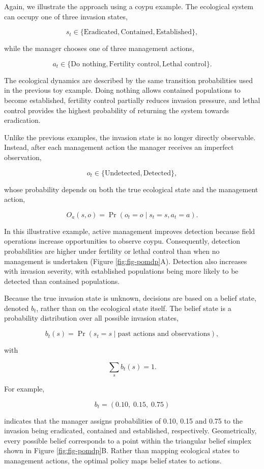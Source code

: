 \documentclass[
  11pt,
  a4paper,
]{article}
\begin{document}
Again, we illustrate the approach using a coypu example. The ecological system can occupy one of three invasion states,

\[
s_t \in
\{\text{Eradicated},
\text{Contained},
\text{Established}\},
\]

while the manager chooses one of three management actions,

\[
a_t \in
\{\text{Do nothing},
\text{Fertility control},
\text{Lethal control}\}.
\]

The ecological dynamics are described by the same transition probabilities used in the previous toy example. Doing nothing allows contained populations to become established, fertility control partially reduces invasion pressure, and lethal control provides the highest probability of returning the system towards eradication.

Unlike the previous examples, the invasion state is no longer directly observable. Instead, after each management action the manager receives an imperfect observation,

\[
o_t \in
\{\text{Undetected},
\text{Detected}\},
\]

whose probability depends on both the true ecological state and the management action,

\[
O_a(s,o)
=
\Pr(o_t=o \mid s_t=s,a_t=a).
\]

In this illustrative example, active management improves detection because field operations increase opportunities to observe coypu. Consequently, detection probabilities are higher under fertility or lethal control than when no management is undertaken (Figure \ref{fig:fig-pomdp}A). Detection also increases with invasion severity, with established populations being more likely to be detected than contained populations.

Because the true invasion state is unknown, decisions are based on a belief state, denoted \(b_t\), rather than on the ecological state itself. The belief state is a probability distribution over all possible invasion states,

\[
b_t(s)
=
\Pr(s_t=s
\mid
\text{past actions and observations}),
\]

with

\[
\sum_s b_t(s)=1.
\]

For example,

\[
b_t=(0.10,\;0.15,\;0.75)
\]

indicates that the manager assigns probabilities of 0.10, 0.15 and 0.75 to the invasion being eradicated, contained and established, respectively. Geometrically, every possible belief corresponds to a point within the triangular belief simplex shown in Figure \ref{fig:fig-pomdp}B. Rather than mapping ecological states to management actions, the optimal policy maps belief states to actions.
\end{document}
